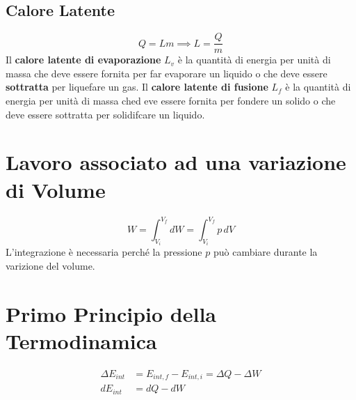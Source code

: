         \subsection*{Calore Latente}
            \begin{equation*}
                Q = Lm \implies L = \frac{Q}{m}
            \end{equation*}
        Il \textbf{calore latente di evaporazione} $L_v$ è la quantità di 
        energia per unità di massa che deve essere fornita per far evaporare un
        liquido o che deve essere \textbf{sottratta} per liquefare un gas. Il 
        \textbf{calore latente di fusione} $L_f$ è la quantità di energia per 
        unità di massa ched eve essere fornita per fondere un solido o che deve
        essere sottratta per solidifcare un liquido.
        
    \section*{Lavoro associato ad una variazione di Volume} 
        \begin{equation*}
            W = \int_{V_i}^{V_f} dW =  \int_{V_i}^{V_f} p \,dV  
        \end{equation*}
    L'integrazione è necessaria perché la pressione $p$ può cambiare durante la
    varizione del volume.

    \section*{Primo Principio della Termodinamica}
        \begin{align*}
            \Delta E_{int} &= E_{int, f} - E_{int, i} = \Delta Q - \Delta W \\
            d E_{int} &= d Q - d W
        \end{align*}

